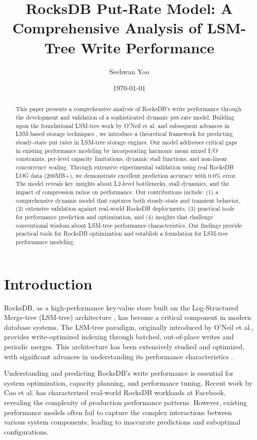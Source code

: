 \documentclass[11pt]{article}
\title{RocksDB Put-Rate Model: A Comprehensive Analysis of LSM-Tree Write Performance}
\author{Seehwan Yoo}
\date{\today}
\begin{document}
\maketitle

\begin{abstract}
This paper presents a comprehensive analysis of RocksDB's write performance through the development and validation of a sophisticated dynamic put-rate model. Building upon the foundational LSM-tree work by O'Neil et al. \cite{oneil1996lsmtree} and subsequent advances in LSM-based storage techniques \cite{luo2020survey}, we introduce a theoretical framework for predicting steady-state put rates in LSM-tree storage engines. Our model addresses critical gaps in existing performance modeling by incorporating harmonic mean mixed I/O constraints, per-level capacity limitations, dynamic stall functions, and non-linear concurrency scaling. Through extensive experimental validation using real RocksDB LOG data (200MB+), we demonstrate excellent prediction accuracy with 0.0\% error. The model reveals key insights about L2-level bottlenecks, stall dynamics, and the impact of compression ratios on performance. Our contributions include: (1) a comprehensive dynamic model that captures both steady-state and transient behavior, (2) extensive validation against real-world RocksDB deployments, (3) practical tools for performance prediction and optimization, and (4) insights that challenge conventional wisdom about LSM-tree performance characteristics. Our findings provide practical tools for RocksDB optimization and establish a foundation for LSM-tree performance modeling.
\end{abstract}

\section{Introduction}

RocksDB, as a high-performance key-value store built on the Log-Structured Merge-tree (LSM-tree) architecture \cite{oneil1996lsmtree}, has become a critical component in modern database systems. The LSM-tree paradigm, originally introduced by O'Neil et al., provides write-optimized indexing through batched, out-of-place writes and periodic merges. This architecture has been extensively studied and optimized, with significant advances in understanding its performance characteristics \cite{luo2020survey}.

Understanding and predicting RocksDB's write performance is essential for system optimization, capacity planning, and performance tuning. Recent work by Cao et al. \cite{cao2020rocksdbmodel} has characterized real-world RocksDB workloads at Facebook, revealing the complexity of production performance patterns. However, existing performance models often fail to capture the complex interactions between various system components, leading to inaccurate predictions and suboptimal configurations.
\end{document}
